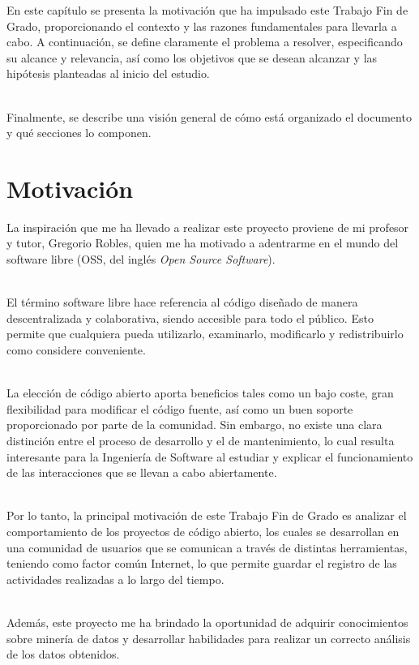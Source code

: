 \documentclass[a4paper, 12pt]{book}
\begin{document}
En este capítulo se presenta la motivación que ha impulsado este Trabajo Fin de Grado,
proporcionando el contexto y las razones fundamentales para llevarla a cabo. A continuación, 
se define claramente el problema a resolver, especificando su alcance y relevancia, así como 
los objetivos que se desean alcanzar y las hipótesis planteadas al inicio del estudio.

\\Finalmente, se describe una visión general de cómo está organizado el documento y qué secciones lo componen.

\section{Motivación}
\label{sec:motivación}

La inspiración que me ha llevado a realizar este proyecto proviene de mi profesor y tutor, Gregorio Robles, quien me ha
motivado a adentrarme en el mundo del software libre (OSS, del inglés \textit{Open Source Software}).

\\El término software libre hace referencia al código diseñado de manera descentralizada y colaborativa, siendo
accesible para todo el público. Esto permite que cualquiera pueda utilizarlo, examinarlo, modificarlo y
redistribuirlo como considere conveniente.

\\La elección de código abierto aporta beneficios tales como un bajo coste, gran flexibilidad para
modificar el código fuente, así como un buen soporte proporcionado por parte de la comunidad.
Sin embargo, no existe una clara distinción entre el proceso de desarrollo y el de mantenimiento, lo cual resulta interesante
para la Ingeniería de Software al estudiar y explicar el funcionamiento de las interacciones que se llevan a cabo abiertamente.

\\Por lo tanto, la principal motivación de este Trabajo Fin de Grado es analizar el comportamiento de los proyectos de código abierto, los cuales se
desarrollan en una comunidad de usuarios que se comunican a través de distintas herramientas, teniendo como factor común Internet, lo que
permite guardar el registro de las actividades realizadas a lo largo del tiempo.

\\Además, este proyecto me ha brindado la oportunidad de adquirir conocimientos sobre minería de datos y desarrollar
habilidades para realizar un correcto análisis de los datos obtenidos.
\end{document}
